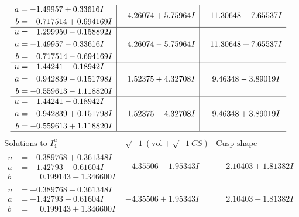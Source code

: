 \documentclass[1p]{elsarticle_modified}
\theoremstyle{definition}
\newcommand{\I}{\sqrt{-1}}
\begin{document}
$$\begin{array}{c|c|c}
\begin{aligned}
a &= -1.49957 + 0.33616 I \\
b &= \phantom{-}0.717514 + 0.694169 I\end{aligned}
 & \phantom{-}4.26074 + 5.75964 I & \phantom{-}11.30648 - 7.65537 I \\ \hline\begin{aligned}
u &= \phantom{-}1.299950 - 0.158892 I \\
a &= -1.49957 - 0.33616 I \\
b &= \phantom{-}0.717514 - 0.694169 I\end{aligned}
 & \phantom{-}4.26074 - 5.75964 I & \phantom{-}11.30648 + 7.65537 I \\ \hline\begin{aligned}
u &= \phantom{-}1.44241 + 0.18942 I \\
a &= \phantom{-}0.942839 - 0.151798 I \\
b &= -0.559613 - 1.118820 I\end{aligned}
 & \phantom{-}1.52375 + 4.32708 I & \phantom{-}9.46348 - 3.89019 I \\ \hline\begin{aligned}
u &= \phantom{-}1.44241 - 0.18942 I \\
a &= \phantom{-}0.942839 + 0.151798 I \\
b &= -0.559613 + 1.118820 I\end{aligned}
 & \phantom{-}1.52375 - 4.32708 I & \phantom{-}9.46348 + 3.89019 I\\
 \hline 
 \end{array}$$\newpage$$\begin{array}{c|c|c}  
\text{Solutions to }I^u_{4}& \I (\text{vol} + \sqrt{-1}CS) & \text{Cusp shape}\\
 \hline 
\begin{aligned}
u &= -0.389768 + 0.361348 I \\
a &= -1.42793 - 0.61604 I \\
b &= \phantom{-}0.199143 - 1.346600 I\end{aligned}
 & -4.35506 - 1.95343 I & \phantom{-}2.10403 + 1.81382 I \\ \hline\begin{aligned}
u &= -0.389768 - 0.361348 I \\
a &= -1.42793 + 0.61604 I \\
b &= \phantom{-}0.199143 + 1.346600 I\end{aligned}
 & -4.35506 + 1.95343 I & \phantom{-}2.10403 - 1.81382 I \\ \hline\begin{aligned}

\end{aligned}
\end{array}$$
\end{document}
